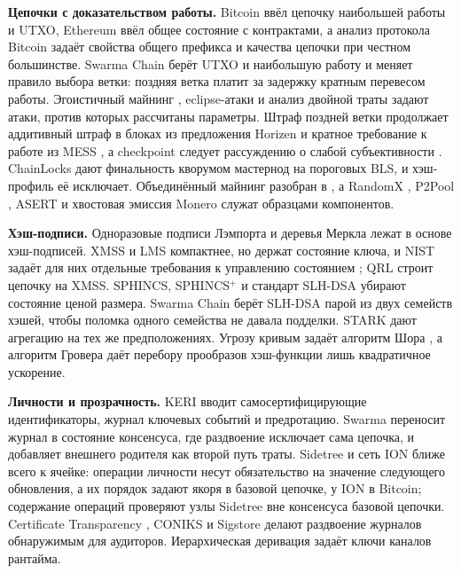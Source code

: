 \documentclass[10pt,a4paper]{article}
\begin{document}
\textbf{Цепочки с доказательством работы.}
Bitcoin \cite{bitcoin} ввёл цепочку наибольшей работы и UTXO, Ethereum \cite{ethereum,ethyellow} ввёл общее состояние с контрактами, а анализ протокола Bitcoin \cite{backbone} задаёт свойства общего префикса и качества цепочки при честном большинстве.
Swarma Chain берёт UTXO и наибольшую работу и меняет правило выбора ветки: поздняя ветка платит за задержку кратным перевесом работы.
Эгоистичный майнинг \cite{selfish}, eclipse-атаки \cite{eclipse} и анализ двойной траты \cite{rosenfeld} задают атаки, против которых рассчитаны параметры.
Штраф поздней ветки продолжает аддитивный штраф в блоках из предложения Horizen \cite{horizen} и кратное требование к работе из MESS \cite{mess,messoff}, а checkpoint следует рассуждению о слабой субъективности \cite{weaksubj}.
ChainLocks \cite{chainlocks} дают финальность кворумом мастернод на пороговых BLS, и хэш-профиль её исключает.
Объединённый майнинг разобран в \cite{mergedmining}, а RandomX \cite{randomx}, P2Pool \cite{p2pool}, ASERT \cite{asert} и хвостовая эмиссия Monero \cite{tail} служат образцами компонентов.

\textbf{Хэш-подписи.}
Одноразовые подписи Лэмпорта \cite{lamport79} и деревья Меркла \cite{merkle89} лежат в основе хэш-подписей.
XMSS и LMS \cite{xmss,rfc8391,rfc8554} компактнее, но держат состояние ключа, и NIST задаёт для них отдельные требования к управлению состоянием \cite{sp800208}; QRL \cite{qrl} строит цепочку на XMSS.
SPHINCS, SPHINCS$^+$ и стандарт SLH-DSA \cite{sphincs,sphincsplus,fips205} убирают состояние ценой размера.
Swarma Chain берёт SLH-DSA парой из двух семейств хэшей, чтобы поломка одного семейства не давала подделки.
STARK \cite{stark} дают агрегацию на тех же предположениях.
Угрозу кривым задаёт алгоритм Шора \cite{shor}, а алгоритм Гровера \cite{grover} даёт перебору прообразов хэш-функции лишь квадратичное ускорение.

\textbf{Личности и прозрачность.}
KERI \cite{keri} вводит самосертифицирующие идентификаторы, журнал ключевых событий и предротацию.
Swarma переносит журнал в состояние консенсуса, где раздвоение исключает сама цепочка, и добавляет внешнего родителя как второй путь траты.
Sidetree \cite{sidetree} и сеть ION \cite{ion} ближе всего к ячейке: операции личности несут обязательство на значение следующего обновления, а их порядок задают якоря в базовой цепочке, у ION в Bitcoin; содержание операций проверяют узлы Sidetree вне консенсуса базовой цепочки.
Certificate Transparency \cite{ct,ct2}, CONIKS \cite{coniks} и Sigstore \cite{sigstore} делают раздвоение журналов обнаружимым для аудиторов.
Иерархическая деривация \cite{bip32,slip10} задаёт ключи каналов рантайма.
\end{document}
